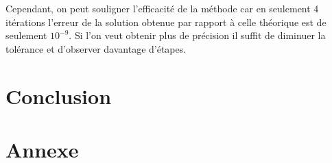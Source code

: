 \documentclass[12,french]{report}
\begin{document}
Cependant, on peut souligner l'efficacité de la méthode car en seulement 4 itérations l'erreur de la solution obtenue par rapport à celle théorique est de seulement $10^{-9}$. Si l'on veut obtenir plus de précision il suffit de diminuer la tolérance et d'observer davantage d'étapes.





\chapter*{Conclusion} %

\chapter*{Annexe}
\end{document}
